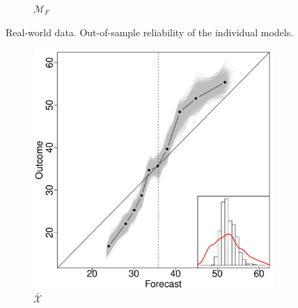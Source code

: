 \documentclass[11pt]{article}
\theoremstyle{definition}
\theoremstyle{definition}
\begin{document}
\begin{figure}[H]
\begin{subfigure}[b]{0.241\textwidth}
                \caption{$\mathcal{M}_F$}
                \label{RelDiagramNoF}
        \end{subfigure}           
          \caption{Real-world data. Out-of-sample reliability of the individual models.}
                \label{RelDiagramMo}
\end{figure}
\begin{figure}[H]
        \centering
 
        \begin{subfigure}[b]{0.323\textwidth}
                \includegraphics[width=\textwidth]{IndependentELP.pdf}
                \caption{$\bar{\mathcal{X}}$}
                \label{fig:mouse}
        \end{subfigure}
                  \begin{subfigure}[b]{0.323\textwidth}

\end{subfigure}
\end{figure}
\end{document}

